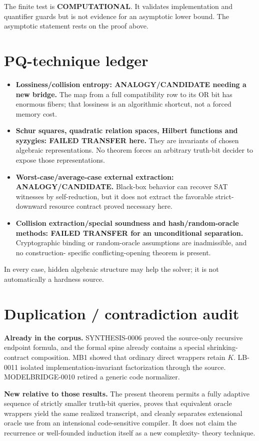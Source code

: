 \documentclass[11pt]{article}
\begin{document}
The finite test is \textbf{COMPUTATIONAL}.  It validates implementation and
quantifier guards but is not evidence for an asymptotic lower bound.  The
asymptotic statement rests on the proof above.

\section{PQ-technique ledger}

\begin{itemize}
\item \textbf{Lossiness/collision entropy: ANALOGY/CANDIDATE needing a new
bridge.}  The map from a full compatibility row to its OR bit has enormous
fibers; that lossiness is an algorithmic shortcut, not a forced memory cost.
\item \textbf{Schur squares, quadratic relation spaces, Hilbert functions and
syzygies: FAILED TRANSFER here.}  They are invariants of chosen algebraic
representations.  No theorem forces an arbitrary truth-bit decider to expose
those representations.
\item \textbf{Worst-case/average-case external extraction: ANALOGY/CANDIDATE.}
Black-box behavior can recover SAT witnesses by self-reduction, but it does not
extract the favorable strict-downward resource contract proved necessary here.
\item \textbf{Collision extraction/special soundness and hash/random-oracle
methods: FAILED TRANSFER for an unconditional separation.}  Cryptographic
binding or random-oracle assumptions are inadmissible, and no construction-
specific conflicting-opening theorem is present.
\end{itemize}
In every case, hidden algebraic structure may help the solver; it is not
automatically a hardness source.

\section{Duplication / contradiction audit}

\textbf{Already in the corpus.}  SYNTHESIS-0006 proved the source-only
recursive endpoint formula, and the formal spine already contains a special
shrinking-contract composition.  MB1 showed that ordinary direct wrappers
retain $K$.  LB-0011 isolated implementation-invariant factorization through
the source.  MODELBRIDGE-0010 retired a generic code normalizer.

\textbf{New relative to those results.}  The present theorem permits a fully
adaptive sequence of strictly smaller truth-bit queries, proves that equivalent
oracle wrappers yield the same realized transcript, and cleanly separates
extensional oracle use from an intensional code-sensitive compiler.  It does
not claim the recurrence or well-founded induction itself as a new complexity-
theory technique.
\end{document}
